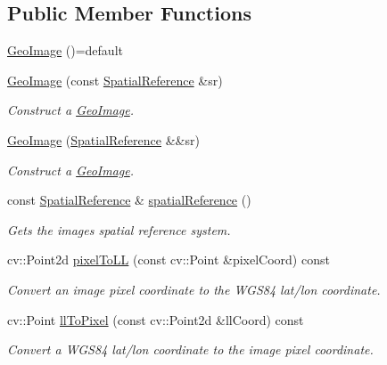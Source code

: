 \subsection*{Public Member Functions}
\begin{DoxyCompactItemize}
\item 
\hyperlink{classdg_1_1deepcore_1_1imagery_1_1_geo_image_aa5426043b9d179eebee34651a2c4fba2}{Geo\+Image} ()=default
\item 
\hyperlink{group___imagery_module_ga68f769446764180ec082de155fd2a7af}{Geo\+Image} (const \hyperlink{classdg_1_1deepcore_1_1imagery_1_1_spatial_reference}{Spatial\+Reference} \&sr)
\begin{DoxyCompactList}\small\item\em Construct a \hyperlink{classdg_1_1deepcore_1_1imagery_1_1_geo_image}{Geo\+Image}. \end{DoxyCompactList}\item 
\hyperlink{group___imagery_module_gab093ef27cf8008d6ce61679a374f9fe8}{Geo\+Image} (\hyperlink{classdg_1_1deepcore_1_1imagery_1_1_spatial_reference}{Spatial\+Reference} \&\&sr)
\begin{DoxyCompactList}\small\item\em Construct a \hyperlink{classdg_1_1deepcore_1_1imagery_1_1_geo_image}{Geo\+Image}. \end{DoxyCompactList}\item 
const \hyperlink{classdg_1_1deepcore_1_1imagery_1_1_spatial_reference}{Spatial\+Reference} \& \hyperlink{group___imagery_module_ga5a6179a2654ef54bf2605ad9e8dbd55a}{spatial\+Reference} ()
\begin{DoxyCompactList}\small\item\em Gets the image\textquotesingle{}s spatial reference system. \end{DoxyCompactList}\item 
cv\+::\+Point2d \hyperlink{group___imagery_module_gaee0adba3fd2460a68400cc7f0df8881b}{pixel\+To\+LL} (const cv\+::\+Point \&pixel\+Coord) const 
\begin{DoxyCompactList}\small\item\em Convert an image pixel coordinate to the W\+G\+S84 lat/lon coordinate. \end{DoxyCompactList}\item 
cv\+::\+Point \hyperlink{group___imagery_module_ga4f8b895c73c1088b06d62035f6fab687}{ll\+To\+Pixel} (const cv\+::\+Point2d \&ll\+Coord) const 
\begin{DoxyCompactList}\small\item\em Convert a W\+G\+S84 lat/lon coordinate to the image pixel coordinate. \end{DoxyCompactList}\item 

\end{DoxyCompactItemize}
